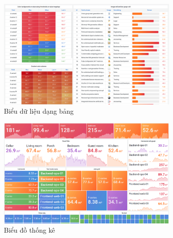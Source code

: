 \begin{figure}[H] %
    \centering %
    \includegraphics[width=0.8\textwidth]{figures/table_light_theme_sized.png} 
    \caption{Biểu dữ liệu dạng bảng} %
    \label{fig:fig_01}
\end{figure}
\begin{figure}[H] %
    \centering %
    \includegraphics[width=0.8\textwidth]{figures/stat_light_theme_sized.png} 
    \caption{Biểu đồ thống kê} %
    \label{fig:fig_01}
\end{figure}

